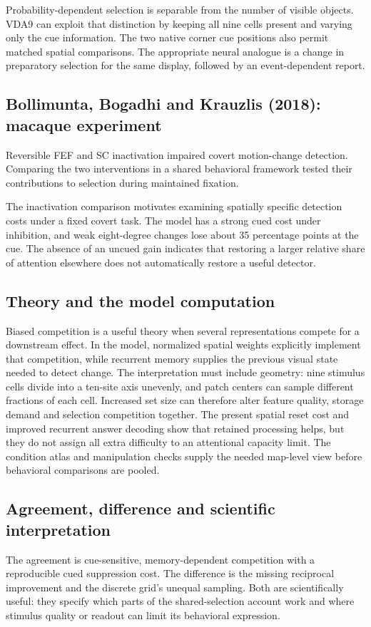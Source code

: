 \documentclass[11pt]{article}
\begin{document}
Probability-dependent selection is separable from the number of visible objects. VDA9 can exploit that distinction by keeping all nine cells present and varying only the cue information. The two native corner cue positions also permit matched spatial comparisons. The appropriate neural analogue is a change in preparatory selection for the same display, followed by an event-dependent report.

\subsection{Bollimunta, Bogadhi and Krauzlis (2018): macaque experiment}
Reversible FEF and SC inactivation impaired covert motion-change detection. Comparing the two interventions in a shared behavioral framework tested their contributions to selection during maintained fixation. \cite{bio_bollimunta}

The inactivation comparison motivates examining spatially specific detection costs under a fixed covert task. The model has a strong cued cost under inhibition, and weak eight-degree changes lose about 35 percentage points at the cue. The absence of an uncued gain indicates that restoring a larger relative share of attention elsewhere does not automatically restore a useful detector.

\subsection{Theory and the model computation}
Biased competition is a useful theory when several representations compete for a downstream effect. In the model, normalized spatial weights explicitly implement that competition, while recurrent memory supplies the previous visual state needed to detect change. The interpretation must include geometry: nine stimulus cells divide into a ten-site axis unevenly, and patch centers can sample different fractions of each cell. Increased set size can therefore alter feature quality, storage demand and selection competition together. The present spatial reset cost and improved recurrent answer decoding show that retained processing helps, but they do not assign all extra difficulty to an attentional capacity limit. The condition atlas and manipulation checks supply the needed map-level view before behavioral comparisons are pooled.

\subsection{Agreement, difference and scientific interpretation}
The agreement is cue-sensitive, memory-dependent competition with a reproducible cued suppression cost. The difference is the missing reciprocal improvement and the discrete grid’s unequal sampling. Both are scientifically useful: they specify which parts of the shared-selection account work and where stimulus quality or readout can limit its behavioral expression.
\end{document}
